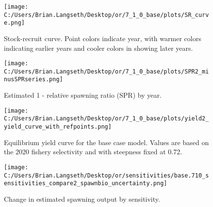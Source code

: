 \documentclass[11pt,
  english,
  a4paper,
]{article}
\begin{document}
\tagmcend\tagstructend


\begin{figure}
\centering
\texttt{[image: C:/Users/Brian.Langseth/Desktop/or/7\_1\_0\_base/plots/SR\_curve.png]}
\caption{Stock-recruit curve. Point colors indicate year, with warmer colors indicating earlier years and cooler colors in showing later years.\label{fig:bh-curve}}
\end{figure}

\tagmcend\tagstructend


\begin{figure}
\centering
\texttt{[image: C:/Users/Brian.Langseth/Desktop/or/7\_1\_0\_base/plots/SPR2\_minusSPRseries.png]}
\caption{Estimated 1 - relative spawning ratio (SPR) by year.\label{fig:1-spr}}
\end{figure}

\tagmcend\tagstructend


\begin{figure}
\centering
\texttt{[image: C:/Users/Brian.Langseth/Desktop/or/7\_1\_0\_base/plots/yield2\_yield\_curve\_with\_refpoints.png]}
\caption{Equilibrium yield curve for the base case model. Values are based on the 2020 fishery selectivity and with steepness fixed at 0.72.\label{fig:yield}}
\end{figure}

\tagmcend\tagstructend


\begin{figure}
\centering
\texttt{[image: C:/Users/Brian.Langseth/Desktop/or/sensitivities/base.710\_sensitivities\_compare2\_spawnbio\_uncertainty.png]}
\caption{Change in estimated spawning output by sensitivity.\label{fig:sens-ssb}}
\end{figure}
\end{document}
